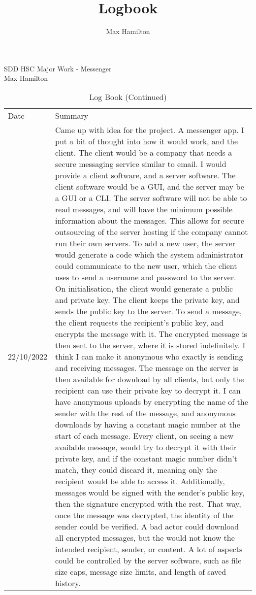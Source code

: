 \documentclass{article}
\author{Max Hamilton}
\title{Logbook}
\date{}
\renewcommand{\maketitle}{
    \begin{center}
        { \huge\bfseries
        \thetitle }

        \vspace{0.25cm}

        SDD HSC Major Work - Messenger\\
        Max Hamilton

        \vspace{0.25cm}

    \end{center}
}
\begin{document}
\maketitle
\centering
\begin{longtable}{p{}p{}}
\caption{Log Book}\\
\endfirsthead
\caption{Log Book (Continued)}\\
\midrule
\endhead
\toprule
Date & Summary\\
\midrule
22/10/2022 & Came up with idea for the project. A messenger app. I put a bit of thought into how it would work, and the client. The client would be a company that needs a secure messaging service similar to email. I would provide a client software, and a server software. The client software would be a GUI, and the server may be a GUI or a CLI. The server software will not be able to read messages, and will have the minimum possible information about the messages. This allows for secure outsourcing of the server hosting if the company cannot run their own servers. To add a new user, the server would generate a code which the system administrator could communicate to the new user, which the client uses to send a username and password to the server. On initialisation, the client would generate a public and private key. The client keeps the private key, and sends the public key to the server. To send a message, the client requests the recipient's public key, and encrypts the message with it. The encrypted message is then sent to the server, where it is stored indefinitely. I think I can make it anonymous who exactly is sending and receiving messages. The message on the server is then available for download by all clients, but only the recipient can use their private key to decrypt it. I can have anonymous uploads by encrypting the name of the sender with the rest of the message, and anonymous downloads by having a constant magic number at the start of each message. Every client, on seeing a new available message, would try to decrypt it with their private key, and if the constant magic number didn't match, they could discard it, meaning only the recipient would be able to access it. Additionally, messages would be signed with the sender's public key, then the signature encrypted with the rest. That way, once the message was decrypted, the identity of the sender could be verified. A bad actor could download all encrypted messages, but the would not know the intended recipient, sender, or content. A lot of aspects could be controlled by the server software, such as file size caps, message size limits, and length of saved history.\\

\end{longtable}
\end{document}
